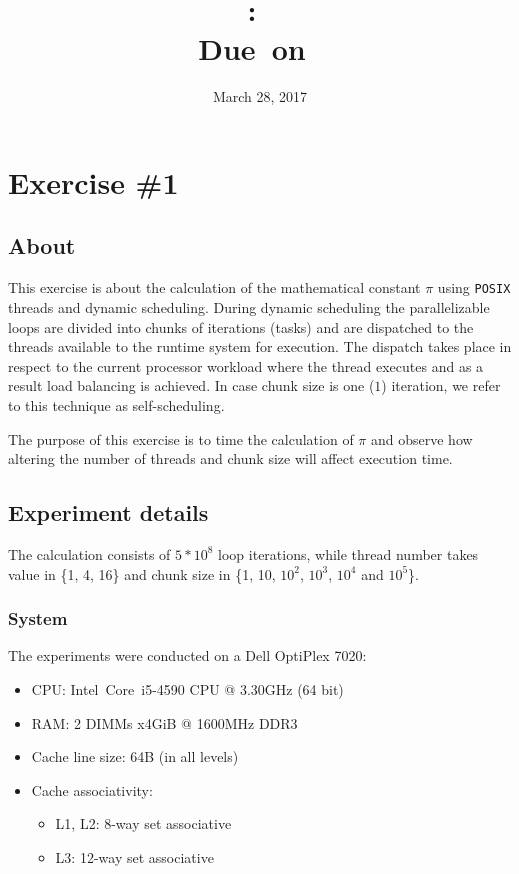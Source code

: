 \documentclass{article}
\title{
\vspace{2in}
\textmd{\textbf{\hmwkClass:\ \hmwkTitle}}\\
\normalsize\vspace{0.1in}\small{Due\ on\ \hmwkDueDate}\\
\vspace{0.1in}\large{\textit{\hmwkClassInstructor}}
\vspace{3in}
}
\author{\textbf{\hmwkAuthorName}}
\date{March 28, 2017} %
\begin{document}
\maketitle


\newpage
\tableofcontents
\newpage


\section{Exercise \#1}
\subsection{About}
This exercise is about the calculation of the mathematical constant $\pi$ using \texttt{POSIX}
threads and dynamic scheduling. During dynamic scheduling the parallelizable loops are divided
into chunks of iterations (tasks) and are dispatched to the threads available to the runtime
system for execution. The dispatch takes place in respect to the current processor workload
where the thread executes and as a result load balancing is achieved. In case chunk size is
one ($1$) iteration, we refer to this technique as self-scheduling.

The purpose of this exercise is to time the calculation of $\pi$ and observe how altering
the number of threads and chunk size will affect execution time.

\subsection{Experiment details}

The calculation consists of $5*10^8$ loop iterations, while thread number takes value in \{1, 4, 16\} and
chunk size in \{1, 10, $10^2$, $10^3$, $10^4$ and $10^5$\}.

\subsubsection{System}
The experiments were conducted on a Dell OptiPlex 7020:
\begin{itemize}
 \item CPU: Intel\textregistered \ Core\texttrademark \ i5-4590 CPU @ 3.30GHz (64 bit)
 \item RAM: 2 DIMMs x4GiB @ 1600MHz DDR3
 \item Cache line size: 64B (in all levels)
 \item Cache associativity:
 \begin{itemize}
  \item L1, L2: 8-way set associative
  \item L3: 12-way set associative
 \end{itemize}
\end{itemize}
\end{document}
